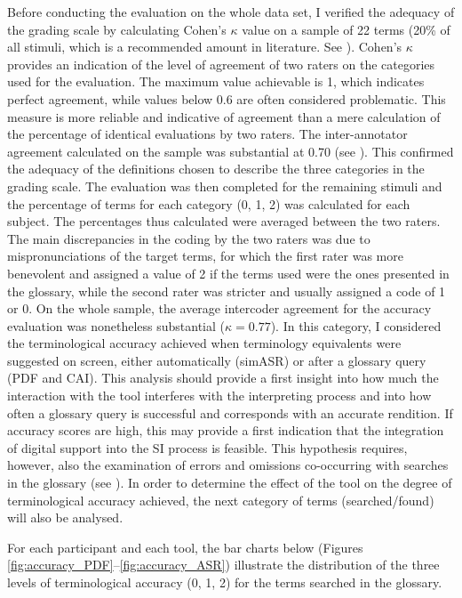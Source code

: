 Before conducting the evaluation on the whole data set, I verified the adequacy of the grading scale by calculating Cohen's $\kappa$ value on a sample of 22 terms (20\% of all stimuli, which is a recommended amount in literature. See \citealt[326]{mellinger_quantitative_2017}). Cohen's $\kappa$ provides an indication of the level of agreement of two raters on the categories used for the evaluation. The maximum value achievable is 1, which indicates perfect agreement, while values below 0.6 are often considered problematic. This measure is more reliable and indicative of agreement than a mere calculation of the percentage of identical evaluations by two raters. The inter-annotator agreement calculated on the sample was substantial at 0.70 (see \citealt{landis_measurement_1977}). This confirmed the adequacy of the definitions chosen to describe the three categories in the grading scale. The evaluation was then completed for the remaining stimuli and the percentage of terms for each category (0, 1, 2) was calculated for each subject. The percentages thus calculated were averaged between the two raters. The main discrepancies in the coding by the two raters was due to mispronunciations of the target terms, for which the first rater was more benevolent and assigned a value of 2 if the terms used were the ones presented in the glossary, while the second rater was stricter and usually assigned a code of 1 or 0. On the whole sample, the average intercoder agreement for the accuracy evaluation was nonetheless substantial ($\kappa = 0.77$).
 \label{accuracy_searched}
In this category, I considered the terminological accuracy achieved when terminology equivalents were suggested on screen, either automatically (simASR) or after a glossary query (PDF and CAI). This analysis should provide a first insight into how much the interaction with the tool interferes with the interpreting process and into how often a glossary query is successful and corresponds with an accurate rendition. If accuracy scores are high, this may provide a first indication that the integration of digital support into the SI process is feasible. This hypothesis requires, however, also the examination of errors and omissions co-occurring with searches in the glossary (see ). In order to determine the effect of the tool on the degree of terminological accuracy achieved, the next category of terms (searched/found) will also be analysed.

For each participant and each tool, the bar charts below (Figures \ref{fig:accuracy_PDF}--\ref{fig:accuracy_ASR}) illustrate the distribution of the three levels of terminological accuracy (0, 1, 2) for the terms searched in the glossary.

